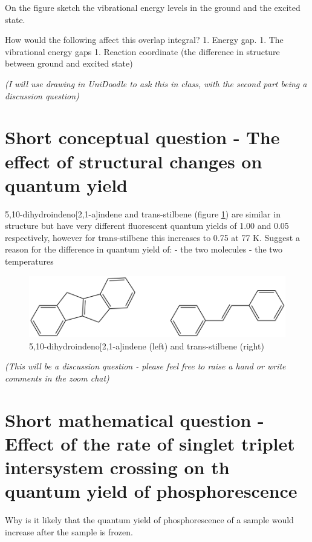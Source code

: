 \documentclass[
]{book}
\begin{document}
On the figure sketch the vibrational energy levels in the ground and the excited state.

How would the following affect this overlap integral?
1. Energy gap.
1. The vibrational energy gaps
1. Reaction coordinate (the difference in structure between ground and excited state)

\emph{(I will use drawing in UniDoodle to ask this in class, with the second part being a discussion question)}

\hypertarget{sec:structureQY}{%
\section{Short conceptual question - The effect of structural changes on quantum yield}\label{sec:structureQY}}

5,10-dihydroindeno{[}2,1-a{]}indene and trans-stilbene (figure \ref{fig:stilbeneindene}) are similar in structure but have very different fluorescent quantum yields of 1.00 and 0.05 respectively, however for trans-stilbene this increases to 0.75 at 77 K. Suggest a reason for the difference in quantum yield of:
- the two molecules
- the two temperatures

\begin{figure}

{\centering \includegraphics[width=0.6\linewidth]{Images/stilbeneindene} 

}

\caption{5,10-dihydroindeno[2,1-a]indene (left) and trans-stilbene (right)}\label{fig:stilbeneindene}
\end{figure}

\emph{(This will be a discussion question - please feel free to raise a hand or write comments in the zoom chat)}

\hypertarget{sec:ratephos}{%
\section{Short mathematical question - Effect of the rate of singlet triplet intersystem crossing on th quantum yield of phosphorescence}\label{sec:ratephos}}

Why is it likely that the quantum yield of phosphorescence of a sample would increase after the sample is frozen.
\end{document}
